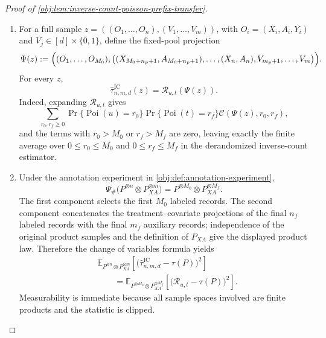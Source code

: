 \documentclass[11pt]{article}
\begin{document}
\begin{proof}[Proof of \cref{obj:lem:inverse-count-poisson-prefix-transfer}]
\begin{enumerate}
\item
For a full sample \(z=((O_1,\ldots,O_n),(V_1,\ldots,V_m))\), with \(O_i=(X_i,A_i,Y_i)\) and \(V_j\in[d]\times\{0,1\}\), define the fixed-pool projection
\[
\Psi(z)
:=
\Bigl(
  (O_1,\ldots,O_{M_0}),
  \bigl((X_{M_0+n_p+1},A_{M_0+n_p+1}),\ldots,(X_n,A_n),
        V_{m_p+1},\ldots,V_m\bigr)
\Bigr).
\]
For every \(z\),
\[
\widehat\tau^{\mathrm{IC}}_{n,m,d}(z)
=
\mathcal R_{u,t}(\Psi(z)).
\]
Indeed, expanding \(\mathcal R_{u,t}\) gives
\[
\sum_{r_0,r_f\ge0}
\Pr\{\operatorname{Poi}(u)=r_0\}
\Pr\{\operatorname{Poi}(t)=r_f\}
\mathcal C(\Psi(z),r_0,r_f),
\]
and the terms with \(r_0>M_0\) or \(r_f>M_f\) are zero, leaving exactly the finite average over \(0\le r_0\le M_0\) and \(0\le r_f\le M_f\) in the derandomized inverse-count estimator.

\item
Under the annotation experiment in \cref{obj:def:annotation-experiment},
\[
\Psi_{\#}\bigl(P^{\otimes n}\otimes P_{XA}^{\otimes m}\bigr)
=
P^{\otimes M_0}\otimes P_{XA}^{\otimes M_f}.
\]
The first component selects the first \(M_0\) labeled records. The second component concatenates the treatment--covariate projections of the final \(n_f\) labeled records with the final \(m_f\) auxiliary records; independence of the original product samples and the definition of \(P_{XA}\) give the displayed product law. Therefore the change of variables formula yields
\[
\begin{aligned}
&\mathbb E_{P^{\otimes n}\otimes P_{XA}^{\otimes m}}
 \!\left[
  \bigl(\widehat\tau^{\mathrm{IC}}_{n,m,d}-\tau(P)\bigr)^2
 \right]  \\
&\qquad =
\mathbb E_{P^{\otimes M_0}\otimes P_{XA}^{\otimes M_f}}
 \!\left[
  \bigl(\mathcal R_{u,t}-\tau(P)\bigr)^2
 \right].
\end{aligned}
\]
Measurability is immediate because all sample spaces involved are finite products and the statistic is clipped.


\end{enumerate}
\end{proof}
\end{document}
